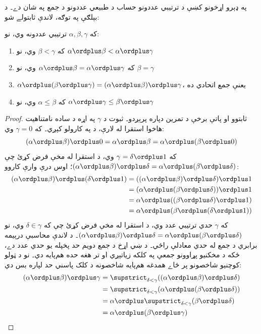 \documentclass[../../../include/open-logic-section]{subfiles}
\begin{document}
په ډېرو اړخونو کښې د ترتيبي عددونو حساب د طبيعي عددونو د جمع
په شان دے۔ د بېلګې په توګه، لاندې ثابتولے شو:

\begin{lem}
که $\alpha, \beta, \gamma$ ترتيبي عددونه وي، نو:
\begin{enumerate}
	\item{} که $\beta < \gamma$ وي، نو $\alpha
	\ordplus  \beta < \alpha \ordplus  \gamma$
	\item{} که $\alpha \ordplus  \beta =
	\alpha\ordplus \gamma$ وي، نو $\beta = \gamma$
	\item{} $\alpha \ordplus  (\beta \ordplus
	\gamma) = (\alpha \ordplus  \beta) \ordplus  \gamma$، يعنې
	جمع اتحادي ده
	\item{} که $\alpha \leq \beta$ وي، نو $\alpha
	\ordplus  \gamma \leq \beta \ordplus \gamma$
\end{enumerate}
\end{lem}

\begin{proof}
 ثابتوو او پاتې برخې د تمرين دپاره پرېږدو۔
ثبوت د $\gamma$ په اړه د ساده نامتناهيت هاخوا استقرا له لارې،
د  په کارولو کېږي۔ که $\gamma = 0$ وي:
\[
(\alpha \ordplus  \beta) \ordplus  0 = \alpha \ordplus  \beta  = \alpha \ordplus  (\beta \ordplus  0)
\]
که $\gamma = \delta\ordplus 1$ وي، د استقرا له مخې فرض کړئ چې
$(\alpha \ordplus  \beta) \ordplus  \delta = \alpha \ordplus  (\beta \ordplus
\delta)$؛ اوس  درې وارې کاروو:
\begin{align*}
	(\alpha \ordplus  \beta) \ordplus  (\delta \ordplus  1) & = ((\alpha \ordplus  \beta) \ordplus  \delta)\ordplus 1\\
	& = (\alpha \ordplus  (\beta \ordplus  \delta)) \ordplus  1\\
	& = \alpha \ordplus  ((\beta \ordplus  \delta)\ordplus 1)\\
	& = \alpha \ordplus  (\beta \ordplus  (\delta\ordplus 1))
\end{align*}
که $\gamma$ حدي ترتيبي عدد وي، د استقرا له مخې فرض کړئ چې که
$\delta \in \gamma$ وي، نو
$(\alpha \ordplus  \beta) \ordplus  \delta =
\alpha \ordplus  (\beta \ordplus  \delta)$۔ د لاندې محاسبې
درېيمه برابري د جمع له حدي معادلې راځي۔ د ښي اړخ د جمع دويم
حد پخپله يو حدي عدد دے، ځکه د مخکنيو پړاوونو جمعې په کلکه
زياتېږي او تر هغه حده هم‌پايه دي۔ نو د ټولو کوچنيو شاخصونو
پر ځاے همدغه هم‌پايه شاخصونه د کلک پاسني حد لپاره بس دي:
\begin{align*}
	(\alpha \ordplus  \beta) \ordplus  \gamma & = \supstrict_{\delta < \gamma}((\alpha \ordplus  \beta) \ordplus  \delta) \\
	&= \supstrict_{\delta < \gamma}(\alpha \ordplus  (\beta \ordplus  \delta))\\
	&= \alpha \ordplus  \supstrict_{\delta < \gamma}(\beta \ordplus  \delta)\\
	& = \alpha \ordplus  (\beta \ordplus  \gamma)
\end{align*}
\end{proof}
\end{document}
